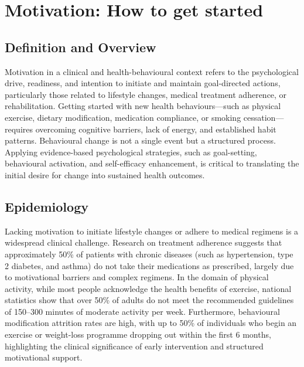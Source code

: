 \chapter{Motivation: How to get started}

\section*{Definition and Overview}
Motivation in a clinical and health-behavioural context refers to the psychological drive, readiness, and intention to initiate and maintain goal-directed actions, particularly those related to lifestyle changes, medical treatment adherence, or rehabilitation. Getting started with new health behaviours—such as physical exercise, dietary modification, medication compliance, or smoking cessation—requires overcoming cognitive barriers, lack of energy, and established habit patterns. Behavioural change is not a single event but a structured process. Applying evidence-based psychological strategies, such as goal-setting, behavioural activation, and self-efficacy enhancement, is critical to translating the initial desire for change into sustained health outcomes.

\section*{Epidemiology}
Lacking motivation to initiate lifestyle changes or adhere to medical regimens is a widespread clinical challenge. Research on treatment adherence suggests that approximately 50\% of patients with chronic diseases (such as hypertension, type 2 diabetes, and asthma) do not take their medications as prescribed, largely due to motivational barriers and complex regimens. In the domain of physical activity, while most people acknowledge the health benefits of exercise, national statistics show that over 50\% of adults do not meet the recommended guidelines of 150--300 minutes of moderate activity per week. Furthermore, behavioural modification attrition rates are high, with up to 50\% of individuals who begin an exercise or weight-loss programme dropping out within the first 6 months, highlighting the clinical significance of early intervention and structured motivational support.

